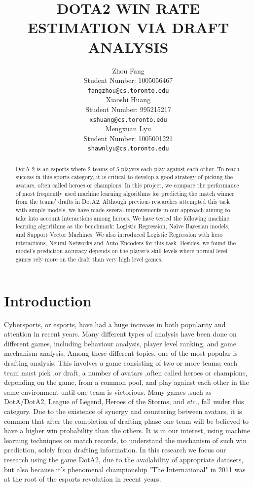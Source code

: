 \documentclass{article}
\title{DOTA2 WIN RATE ESTIMATION VIA DRAFT ANALYSIS}
\author{
  Zhou Fang \\
  Student Number: 1005056467\\
  \texttt{fangzhou@cs.toronto.edu} \\
  \And
  Xiaoshi Huang \\
  Student Number: 995215217\\
  \texttt{xshuang@cs.toronto.edu} \\
  \AND
  Mengxuan Lyu \\
  Student Number: 1005001221\\
  \texttt{shawnlyu@cs.toronto.edu} \\
}
\begin{document}

\maketitle

\begin{abstract}
DotA 2 is an esports where 2 teams of 5 players each play against each other. To reach success in this sports category, it is critical to develop a good strategy of picking the avatars, often called heroes or champions. In this project, we compare the performance of most frequently used machine learning algorithms for predicting the match winner from the teams’ drafts in DotA2. Although previous researches attempted this task with simple models, we have made several improvements in our approach aiming to take into account interactions among heroes. We have tested the following machine learning algorithms as the benchmark: Logistic Regression, Naïve Bayesian models, and Support Vector Machines. We also introduced Logistic Regression with hero interactions, Neural Networks and Auto Encoders for this task. Besides, we found the model’s prediction accuracy depends on the player's skill levels where normal level games rely more on the draft than very high level games. 
\end{abstract}

\section{Introduction}
Cybersports, or esports, have had a huge increase in both popularity and attention in recent years. Many different types of analysis have been done on different games, including behaviour analysis, player level ranking, and game mechanism analysis. Among these different topics, one of the most popular is drafting analysis. This involves a game consisting of two or more teams; each team must pick ,or draft, a number of avatars ,often called heroes or champions, depending on the game, from a common pool, and play against each other in the same environment until one team is victorious. Many games ,such as DotA/DotA2, League of Legend, Heroes of the Storms, and \textit{etc}., fall under this category. Due to the existence of synergy and countering between avatars, it is common that after the completion of drafting phase one team will be believed to have a higher win probability than the others. It is in our interest, using machine learning techniques on match records, to understand the mechanism of such win prediction, solely from drafting information. In this research we focus our research using the game DotA2, due to the availability of appropriate datasets, but also because it’s phenomenal championship "The International" in 2011 was at the root of the esports revolution in recent years.
\end{document}
